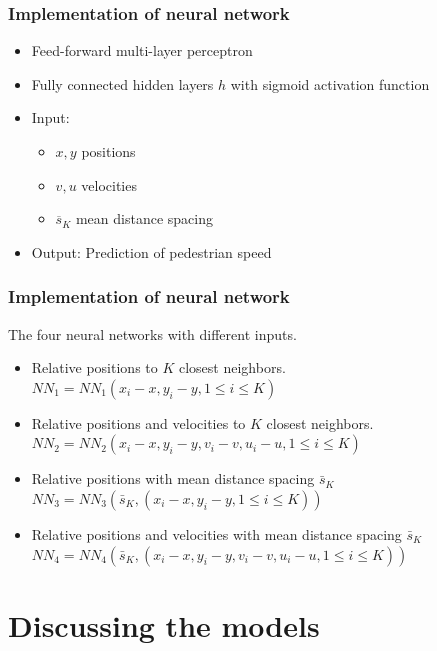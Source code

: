 \begin{frame}
    \frametitle{Implementation of neural network}
    \begin{itemize}
        \item Feed-forward multi-layer perceptron
        \item Fully connected hidden layers $h$ with sigmoid activation function
        \item Input: 
        \begin{itemize}
            \item $x, y$ positions
            \item $v, u$ velocities
            \item $\overline{s}_K$ mean distance spacing
        \end{itemize}
        \item Output: Prediction of pedestrian speed
    \end{itemize}
\end{frame}

\begin{frame}
    \frametitle{Implementation of neural network}
    The four neural networks with different inputs.  
    \begin{itemize}
        \item Relative positions to $K$ closest neighbors.\\
        $NN_1 = NN_1(x_i - x, y_i - y, 1 \leq i \leq K)$
        \item Relative positions and velocities to $K$ closest neighbors. 
        $NN_2 = NN_2(x_i - x, y_i - y,v_i - v,u_i -u, 1 \leq i \leq K)$
        \item Relative positions with mean distance spacing $\bar s_K$\\
        $NN_3 = NN_3(\bar s_K ,(x_i - x, y_i - y, 1 \leq i \leq K))$
        \item Relative positions and velocities with mean distance spacing $\bar s_K$\\
        $NN_4 = NN_4(\bar s_K,(x_i - x, y_i - y,v_i - v,u_i -u, 1 \leq i \leq K))$
    \end{itemize}
\end{frame}

\section{Discussing the models}

